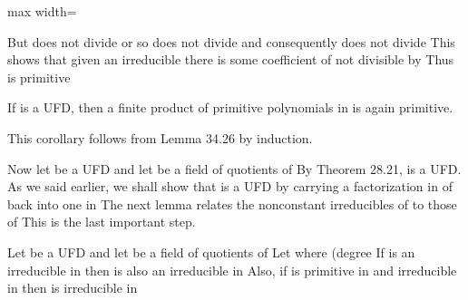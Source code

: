 \documentclass[11pt,oneside]{article}
\begin{document}
\begin{BookBody}
\begin{center}\begin{adjustbox}{max width=\linewidth}\end{adjustbox}\end{center}

\noindent But  does not divide  or  so  does not divide  and consequently  does not divide  This shows that given an irreducible  there is some coefficient of  not divisible by  Thus  is primitive\BookEnd{\blacklozenge}

 If  is a UFD, then a finite product of primitive polynomials in  is again primitive.

 This corollary follows from Lemma 34.26 by induction. \BookEnd{\blacklozenge}

Now let  be a UFD and let  be a field of quotients of  By Theorem 28.21,  is a UFD. As we said earlier, we shall show that  is a UFD by carrying a factorization in  of  back into one in  The next lemma relates the nonconstant irreducibles of  to those of  This is the last important step.

 Let  be a UFD and let  be a field of quotients of  Let  where (degree  If  is an irreducible in  then  is also an irreducible in  Also, if  is primitive in  and irreducible in  then  is irreducible in 

\end{BookBody}

\BookNarrativetrue
\end{document}
